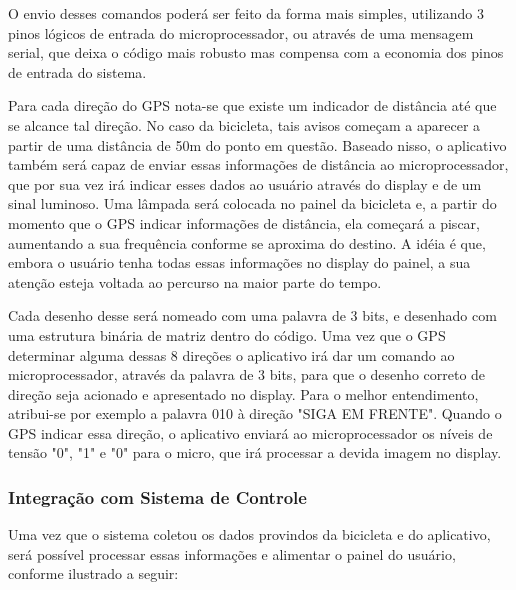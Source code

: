 O envio desses comandos poderá ser feito da forma mais simples, utilizando 3 pinos lógicos de entrada do microprocessador, ou através de uma mensagem serial, que deixa o código mais robusto mas compensa com a economia dos pinos de entrada do sistema.

Para cada direção do GPS nota-se que existe um indicador de distância até que se alcance tal direção. No caso da bicicleta, tais avisos começam a aparecer a partir de uma distância de 50m do ponto em questão. Baseado nisso, o aplicativo também será capaz de enviar essas informações de distância ao microprocessador, que por sua vez irá indicar esses dados ao usuário através do display e de um sinal luminoso.
Uma lâmpada será colocada no painel da bicicleta e, a partir do momento que o GPS indicar informações de distância, ela começará a piscar, aumentando a sua frequência conforme se aproxima do destino. A idéia é que, embora o usuário tenha todas essas informações no display do painel, a sua atenção esteja voltada ao percurso na maior parte do tempo.


Cada desenho desse será nomeado com uma palavra de 3 bits, e desenhado com uma estrutura binária de matriz dentro do código. Uma vez que o GPS determinar alguma dessas 8 direções o aplicativo irá dar um comando ao microprocessador, através da palavra de 3 bits, para que o desenho correto de direção seja acionado e apresentado no display. 
Para o melhor entendimento, atribui-se por exemplo a palavra 010 à direção "SIGA EM FRENTE". Quando o GPS indicar essa direção, o aplicativo enviará ao microprocessador os níveis de tensão "0", "1" e "0" para o micro, que irá processar a devida imagem no display.

\subsubsection{Integração com Sistema de Controle}
Uma vez que o sistema coletou os dados provindos da bicicleta e do aplicativo, será possível processar essas informações e alimentar o painel do usuário, conforme ilustrado a seguir:


